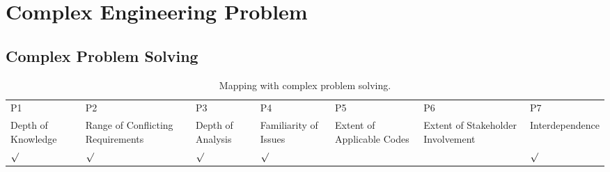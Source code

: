\section{Complex Engineering Problem}
\subsection{Complex Problem Solving}
\begin{table}[H]
\centering
\caption{Mapping with complex problem solving.}
\label{tab:p_solve}
\small
\setlength{\tabcolsep}{4pt}
\begin{tabular}{|*{7}{C{0.105\textwidth}|}}
\hline
P1 & P2 & P3 & P4 & P5 & P6 & P7\\
Depth of Knowledge & Range of Conflicting Require\-ments & Depth of Analysis & Familiarity of Issues & Extent of Applicable Codes & Extent of Stakeholder Involvement & Inter\-dependence\\
\hline
$\surd$ & $\surd$ & $\surd$ & $\surd$ & & & $\surd$\\
\hline
\end{tabular}
\end{table}
